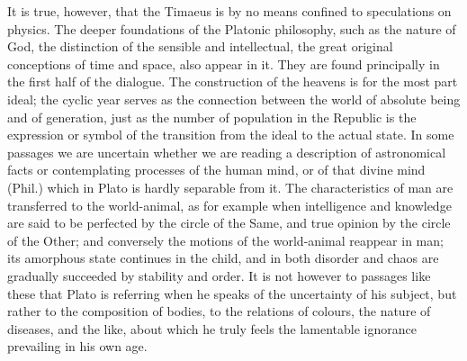 It is true, however, that the Timaeus is by no means confined to
speculations on physics. The deeper foundations of the Platonic
philosophy, such as the nature of God, the distinction of the sensible and
intellectual, the great original conceptions of time and space, also
appear in it. They are found principally in the first half of the
dialogue. The construction of the heavens is for the most part ideal; the
cyclic year serves as the connection between the world of absolute being
and of generation, just as the number of population in the Republic is the
expression or symbol of the transition from the ideal to the actual state.
In some passages we are uncertain whether we are reading a description of
astronomical facts or contemplating processes of the human mind, or of
that divine mind (Phil.) which in Plato is hardly separable from it. The
characteristics of man are transferred to the world-animal, as for example
when intelligence and knowledge are said to be perfected by the circle of
the Same, and true opinion by the circle of the Other; and conversely the
motions of the world-animal reappear in man; its amorphous state continues
in the child, and in both disorder and chaos are gradually succeeded by
stability and order. It is not however to passages like these that Plato
is referring when he speaks of the uncertainty of his subject, but rather
to the composition of bodies, to the relations of colours, the nature of
diseases, and the like, about which he truly feels the lamentable
ignorance prevailing in his own age.

